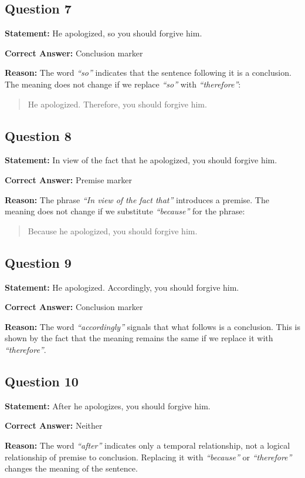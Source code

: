 \documentclass[12pt]{article}
\begin{document}
\subsection*{Question 7}
\textbf{Statement:}
He apologized, so you should forgive him.

\textbf{Correct Answer:} Conclusion marker

\textbf{Reason:}
The word \emph{``so''} indicates that the sentence following it is a conclusion. The meaning does not change if we replace \emph{``so''} with \emph{``therefore''}:
\begin{quote}
    He apologized. Therefore, you should forgive him.
\end{quote}

\subsection*{Question 8}
\textbf{Statement:}
In view of the fact that he apologized, you should forgive him.

\textbf{Correct Answer:} Premise marker

\textbf{Reason:}
The phrase \emph{``In view of the fact that''} introduces a premise. The meaning does not change if we substitute \emph{``because''} for the phrase:
\begin{quote}
    Because he apologized, you should forgive him.
\end{quote}

\subsection*{Question 9}
\textbf{Statement:}
He apologized. Accordingly, you should forgive him.

\textbf{Correct Answer:} Conclusion marker

\textbf{Reason:}
The word \emph{``accordingly''} signals that what follows is a conclusion. This is shown by the fact that the meaning remains the same if we replace it with \emph{``therefore''}.

\subsection*{Question 10}
\textbf{Statement:}
After he apologizes, you should forgive him.

\textbf{Correct Answer:} Neither

\textbf{Reason:}
The word \emph{``after''} indicates only a temporal relationship, not a logical relationship of premise to conclusion. Replacing it with \emph{``because''} or \emph{``therefore''} changes the meaning of the sentence.
\end{document}
